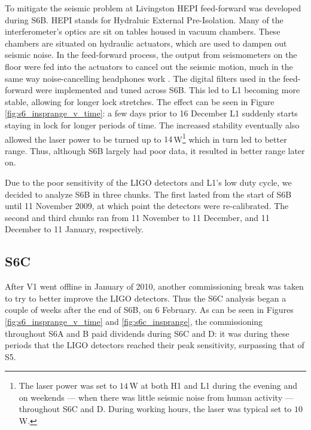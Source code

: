 To mitigate the seismic problem at Livingston HEPI feed-forward was developed during S6B. HEPI stands for Hydraluic External Pre-Isolation. Many of the interferometer's optics are sit on tables housed in vacuum chambers. These chambers are situated on hydraulic actuators, which are used to dampen out seismic noise. In the feed-forward process, the output from seismometers on the floor were fed into the actuators to cancel out the seismic motion, much in the same way noise-cancelling headphones work \cite{ref:Lundgren_comm}. The digital filters used in the feed-forward were implemented and tuned across S6B. This led to L1 becoming more stable, allowing for longer lock stretches. The effect can be seen in Figure \ref{fig:s6_insprange_v_time}: a few days prior to 16 December L1 suddenly starts staying in lock for longer periods of time. The increased stability eventually also allowed the laser power to be turned up to $14\,$W\footnote{The laser power was set to $14\,$W at both H1 and L1 during the evening and on weekends --- when there was little seismic noise from human activity --- throughout S6C and D. During working hours, the laser was typical set to $10\,$W.} which in turn led to better range. Thus, although S6B largely had poor data, it resulted in better range later on.

Due to the poor sensitivity of the \ac{LIGO} detectors and L1's low duty cycle, we decided to analyze S6B in three chunks. The first lasted from the start of S6B until 11 November 2009, at which point the detectors were re-calibrated. The second and third chunks ran from 11 November to 11 December, and 11 December to 11 January, respectively.

\subsection{S6C}
\label{sec:s6c}

After V1 went offline in January of 2010, another commissioning break was taken to try to better improve the \ac{LIGO} detectors. Thus the S6C analysis began a couple of weeks after the end of S6B, on 6 February. As can be seen in Figures \ref{fig:s6_insprange_v_time} and \ref{fig:s6c_insprange}, the commissioning throughout S6A and B paid dividends during S6C and D: it was during these periods that the \ac{LIGO} detectors reached their peak sensitivity, surpassing that of \ac{S5}.

